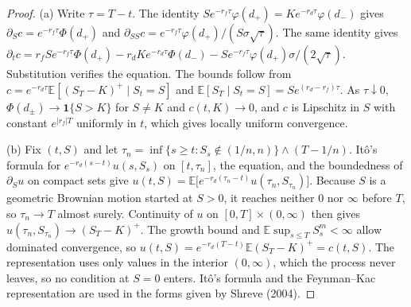 \documentclass[11pt]{article}
\theoremstyle{remark}
\newcommand{\E}{\mathbb{E}}
\begin{document}
\begin{proof}
(a) Write $\tau=T-t$. The identity $Se^{-r_f\tau}\varphi(d_+)=Ke^{-r_d\tau}\varphi(d_-)$ gives $\partial_Sc=e^{-r_f\tau}\Phi(d_+)$ and $\partial_{SS}c=e^{-r_f\tau}\varphi(d_+)/(S\sigma\sqrt\tau)$. The same identity gives $\partial_tc=r_fSe^{-r_f\tau}\Phi(d_+)-r_dKe^{-r_d\tau}\Phi(d_-)-Se^{-r_f\tau}\varphi(d_+)\sigma/(2\sqrt\tau)$. Substitution verifies the equation. The bounds follow from $c=e^{-r_d\tau}\E[(S_T-K)^+\mid S_t=S]$ and $\E[S_T\mid S_t=S]=Se^{(r_d-r_f)\tau}$. As $\tau\downarrow0$, $\Phi(d_\pm)\to\mathbf 1\{S>K\}$ for $S\ne K$ and $c(t,K)\to0$, and $c$ is Lipschitz in $S$ with constant $e^{|r_f|T}$ uniformly in $t$, which gives locally uniform convergence.

(b) Fix $(t,S)$ and let $\tau_n=\inf\{s\ge t:S_s\notin(1/n,n)\}\wedge(T-1/n)$. It\^o's formula for $e^{-r_d(s-t)}u(s,S_s)$ on $[t,\tau_n]$, the equation, and the boundedness of $\partial_Su$ on compact sets give $u(t,S)=\E\bigl[e^{-r_d(\tau_n-t)}u(\tau_n,S_{\tau_n})\bigr]$. Because $S$ is a geometric Brownian motion started at $S>0$, it reaches neither $0$ nor $\infty$ before $T$, so $\tau_n\to T$ almost surely. Continuity of $u$ on $[0,T]\times(0,\infty)$ then gives $u(\tau_n,S_{\tau_n})\to(S_T-K)^+$. The growth bound and $\E\sup_{s\le T}S_s^m<\infty$ allow dominated convergence, so $u(t,S)=e^{-r_d(T-t)}\E(S_T-K)^+=c(t,S)$. The representation uses only values in the interior $(0,\infty)$, which the process never leaves, so no condition at $S=0$ enters. It\^o's formula and the Feynman--Kac representation are used in the forms given by Shreve (2004).
\end{proof}
\end{document}
